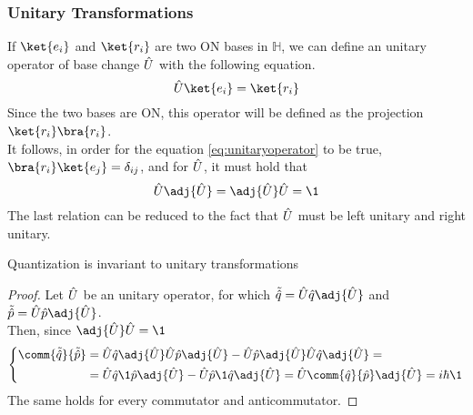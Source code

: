 \documentclass[../qm.tex]{subfiles}
\begin{document}
	\subsubsection{Unitary Transformations}
	If $\ket{e_i}$ and $\ket{r_i}$ are two ON bases in $\mathbb{H}$, we can define an unitary operator of base change $\hat{U}$ with the following equation.\\
	\begin{equation}
		\opr{U}\ket{e_i}=\ket{r_i}
		\label{eq:unitaryoperator}
	\end{equation}
	Since the two bases are ON, this operator will be defined as the projection $\ket{r_i}\bra{r_i}$.\\
	It follows, in order for the equation \eqref{eq:unitaryoperator} to be true, $\bra{r_i}\ket{e_j}=\delta_{ij}$, and for $\hat{U}$, it must hold that
	\begin{equation}
		\opr{U}\adj{\opr{U}}=\adj{\opr{U}}\opr{U}=\1
		\label{eq:leftrightunitariety}
	\end{equation}
	The last relation can be reduced to the fact that $\hat{U}$ must be left unitary and right unitary.
	\begin{thm}
		Quantization is invariant to unitary transformations
	\end{thm}
	\begin{proof}
		Let $\hat{U}$ be an unitary operator, for which $\tilde{\opr{q}}=\opr{U}\opr{q}\adj{\opr{U}}$ and $\tilde{\opr{p}}=\opr{U}\opr{p}\adj{\opr{U}}$.\\
		Then, since $\adj{\opr{U}}\opr{U}=\1$
		\begin{equation}
			\left\{ \begin{aligned}
					\comm{\tilde{\opr{q}}}{\tilde{\opr{p}}}&=\opr{U}\opr{q}\adj{\opr{U}}\opr{U}\opr{p}\adj{\opr{U}}-\opr{U}\opr{p}\adj{\opr{U}}\opr{U}\opr{q}\adj{\opr{U}}=\\
					&=\opr{U}\opr{q}\1\opr{p}\adj{\opr{U}}-\opr{U}\opr{p}\1\opr{q}\adj{\opr{U}}=\opr{U}\comm{\opr{q}}{\opr{p}}\adj{\opr{U}}=i\hbar\1
			\end{aligned}\right.
			\label{eq:unitarytranscons}
		\end{equation}
		The same holds for every commutator and anticommutator.
	\end{proof}
\end{document}
